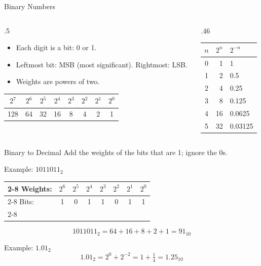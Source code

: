\documentclass[9pt,aspectratio=169,xcolor=table]{beamer}
\newcommand{\striped}{\rowcolors{1}{white}{stripe}}
\begin{document}
\begin{frame}{Binary Numbers}
  \begin{columns}[t]
  \begin{column}{.5\textwidth}
    \begin{itemize}\small
      \item Each digit is a \alert{bit}: 0 or 1.
      \item Leftmost bit: \alert{MSB} (most significant). Rightmost: \alert{LSB}.
      \item Weights are powers of two.
    \end{itemize}
    \vspace{2mm}
    \begin{center}
    \begin{tabular}{|c|c|c|c|c|c|c|c|}
      \hline
      $2^7$ & $2^6$ & $2^5$ & $2^4$ & $2^3$ & $2^2$ & $2^1$ & $2^0$ \\ \hline
      128 & 64 & 32 & 16 & 8 & 4 & 2 & 1 \\ \hline
    \end{tabular}
    \end{center}
  \end{column}
  \begin{column}{.46\textwidth}
    \centering\footnotesize\striped
    \begin{tabular}{@{}crl@{}}
      \toprule
      $n$ & $2^n$ & $2^{-n}$ \\
      \midrule
      0 & 1 & 1 \\
      1 & 2 & 0.5 \\
      2 & 4 & 0.25 \\
      3 & 8 & 0.125 \\
      4 & 16 & 0.0625 \\
      5 & 32 & 0.03125 \\
      \bottomrule
    \end{tabular}
  \end{column}
  \end{columns}
\end{frame}

\begin{frame}{Binary to Decimal}
  Add the weights of the bits that are 1; ignore the 0s.
  \begin{block}{Example: $1011011_2$}
    \centering\small
    \begin{tabular}{l|c|c|c|c|c|c|c|}
      \cline{2-8}
      Weights: & $2^6$ & $2^5$ & $2^4$ & $2^3$ & $2^2$ & $2^1$ & $2^0$ \\ \cline{2-8}
      Bits: & 1 & 0 & 1 & 1 & 0 & 1 & 1 \\ \cline{2-8}
    \end{tabular}
    \[ 1011011_2 = 64 + 16 + 8 + 2 + 1 = 91_{10} \]
  \end{block}
  \begin{block}{Example: $1.01_2$}
    \[ 1.01_2 = 2^0 + 2^{-2} = 1 + \tfrac14 = 1.25_{10} \]
  \end{block}
\end{frame}
\end{document}

